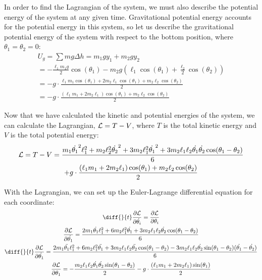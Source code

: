 \documentclass[]{article}
\begin{document}
In order to find the Lagrangian of the system, we must also describe the potential energy of the system at any given time. Gravitational potential energy accounts for the potential energy in this system, so let us describe the gravitational potential energy of the system with respect to the bottom position, where $\theta_1 = \theta_2 = 0$:
\begin{gather*}
	U_g = \sum mg\Delta h = m_1gy_1 + m_2gy_2 \\
	= -\frac{\ell_1m_1g}{2}\cos(\theta_1) - m_2g(\ell_1\cos(\theta_1) + \frac{\ell_2}{2}\cos(\theta_2)) \\
	= -g\cdot\frac{\ell_1m_1\cos(\theta_1) + 2m_2\ell_1\cos(\theta_1) + m_2\ell_2\cos(\theta_2)}{2} \\
	= -g\cdot\frac{(\ell_1m_1 + 2m_2\ell_1)\cos(\theta_1) + m_2\ell_2\cos(\theta_2)}{2}
\end{gather*}

Now that we have calculated the kinetic and potential energies of the system, we can calculate the Lagrangian, $\mathcal{L} = T - V$, where $T$ is the total kinetic energy and $V$ is the total potential energy:
\begin{gather*}
	\mathcal{L} = T - V = \frac{m_1\dot{\theta_1}^2\ell_1^2 + m_2\ell_2^2\dot{\theta_2}^2 + 3m_2\ell_1^2\dot{\theta_1}^2 + 3m_2\ell_1\ell_2\dot{\theta_1}\dot{\theta_2}\cos(\theta_1 - \theta_2)}{6} \\ + g\cdot\frac{(\ell_1m_1 + 2m_2\ell_1)\cos(\theta_1) + m_2\ell_2\cos(\theta_2)}{2}
\end{gather*}

With the Lagrangian, we can set up the Euler-Lagrange differential equation for each coordinate:
\begin{gather*}
	\diff{}{t}\frac{\partial \lagr}{\partial \dot{\theta_i}} = \frac{\partial \lagr}{\partial \theta_i} \\
	\frac{\partial \lagr}{\partial \dot{\theta_1}} = \frac{2m_1\dot{\theta_1}\ell_1^2 + 6m_2\ell_1^2\dot{\theta_1} + 3m_2\ell_1\ell_2\dot{\theta_2}\cos(\theta_1 - \theta_2)}{6} \\
	\diff{}{t}\frac{\partial \lagr}{\partial \dot{\theta_1}} =  \frac{2m_1\ddot{\theta_1}\ell_1^2 + 6m_2\ell_1^2\ddot{\theta_1} + 3m_2\ell_1\ell_2\ddot{\theta_2}\cos(\theta_1 - \theta_2) - 3m_2\ell_1\ell_2\dot{\theta_2}\sin(\theta_1 - \theta_2)(\dot{\theta_1} - \dot{\theta_2})}{6} \\
	\frac{\partial \lagr}{\partial \theta_1} = -\frac{m_2\ell_1\ell_2\dot{\theta_1}\dot{\theta_2}\sin(\theta_1 - \theta_2)}{2} - g\cdot\frac{(\ell_1m_1 + 2m_2\ell_1)\sin(\theta_1)}{2} \\
\end{gather*}
\end{document}

